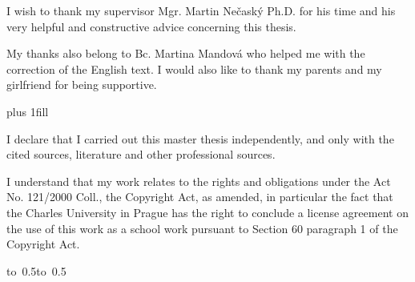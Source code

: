 \documentclass[12pt,a4paper]{report}
\let\openright=\clearpage
\begin{document}

\openright

\noindent
I wish to thank my supervisor Mgr. Martin Nečaský Ph.D. for his time and his
very helpful and constructive advice concerning this thesis.

My thanks also belong to Bc. Martina Mandová who helped me
with the correction of the English text. I would also like to thank
my parents and my girlfriend for being supportive.

\newpage


\vglue 0pt plus 1fill

\noindent
I declare that I carried out this master thesis independently, and only with the cited
sources, literature and other professional sources.

\medskip\noindent
I understand that my work relates to the rights and obligations under the Act No.
121/2000 Coll., the Copyright Act, as amended, in particular the fact that the Charles
University in Prague has the right to conclude a license agreement on the use of this
work as a school work pursuant to Section 60 paragraph 1 of the Copyright Act.

\vspace{10mm}

\hbox{\hbox to 0.5\hbox to 0.5}

\vspace{20mm}
\newpage

\end{document}
